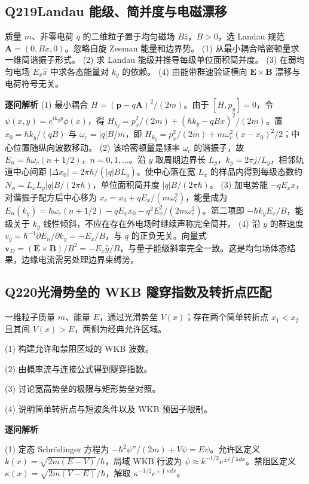 \subsection*{Q219\quad Landau 能级、简并度与电磁漂移}
质量 $m$、非零电荷 $q$ 的二维粒子置于均匀磁场 $B\hat z$，$B>0$，选 Landau 规范 $\mathbf A=(0,Bx,0)$。忽略自旋 Zeeman 能量和边界势。
(1) 从最小耦合哈密顿量求一维简谐振子形式。
(2) 求 Landau 能级并推导每级单位面积简并度。
(3) 在弱均匀电场 $E_x\hat x$ 中求各态能量对 $k_y$ 的依赖。
(4) 由能带群速验证横向 $\mathbf E\times\mathbf B$ 漂移与电荷符号无关。
\par\textbf{逐问解析}
(1) 最小耦合 $H=(\mathbf p-q\mathbf A)^2/(2m)$。由于 $[H,p_y]=0$，令 $\psi(x,y)=e^{ik_yy}\phi(x)$，得 $H_{k_y}=p_x^2/(2m)+(\hbar k_y-qBx)^2/(2m)$。置 $x_0=\hbar k_y/(qB)$ 与 $\omega_c=|q|B/m$，即 $H_{k_y}=p_x^2/(2m)+m\omega_c^2(x-x_0)^2/2$；中心位置随纵向波数移动。
(2) 该哈密顿量是频率 $\omega_c$ 的谐振子，故 $E_n=\hbar\omega_c(n+1/2)$，$n=0,1,\ldots$。沿 $y$ 取周期边界长 $L_y$，$k_y=2\pi j/L_y$，相邻轨道中心间距 $|\Delta x_0|=2\pi\hbar/(|q|BL_y)$。使中心落在宽 $L_x$ 的样品内得到每级态数约 $N_\phi=L_xL_y|q|B/(2\pi\hbar)$，单位面积简并度 $|q|B/(2\pi\hbar)$。
(3) 加电势能 $-qE_xx$，对谐振子配方后中心移为 $x_c=x_0+qE_x/(m\omega_c^2)$，能量成为 $E_n(k_y)=\hbar\omega_c(n+1/2)-qE_xx_0-q^2E_x^2/(2m\omega_c^2)$。第二项即 $-\hbar k_yE_x/B$，能级关于 $k_y$ 线性倾斜，不应在存在外电场时继续声称完全简并。
(4) 沿 $y$ 的群速度 $v_y=\hbar^{-1}\partial E_n/\partial k_y=-E_x/B$，与 $q$ 的正负无关。向量式 $\mathbf v_D=(\mathbf E\times\mathbf B)/B^2=-E_x\hat y/B$，与量子能级斜率完全一致。这是均匀场体态结果，边缘电流需另处理边界束缚势。
\par\medskip

\subsection*{Q220\quad 光滑势垒的 WKB 隧穿指数及转折点匹配}

一维粒子质量 $m$、能量 $E$，通过光滑势垒 $V(x)$；存在两个简单转折点 $x_1<x_2$ 且其间 $V(x)>E$，两侧为经典允许区域。

(1) 构建允许和禁阻区域的 WKB 波数。

(2) 由概率流与连接公式得到隧穿指数。

(3) 讨论宽高势垒的极限与矩形势垒对照。

(4) 说明简单转折点与短波条件以及 WKB 预因子限制。

\par\textbf{逐问解析}

(1) 定态 Schrödinger 方程为 $-\hbar^2\psi''/(2m)+V\psi=E\psi$。允许区定义 $k(x)=\sqrt{2m(E-V)}/\hbar$，局域 WKB 行波为 $\psi\approx k^{-1/2}e^{\pm i\int kdx}$。禁阻区定义 $\kappa(x)=\sqrt{2m(V-E)}/\hbar$，解取 $\kappa^{-1/2}e^{\pm\int\kappa dx}$。

